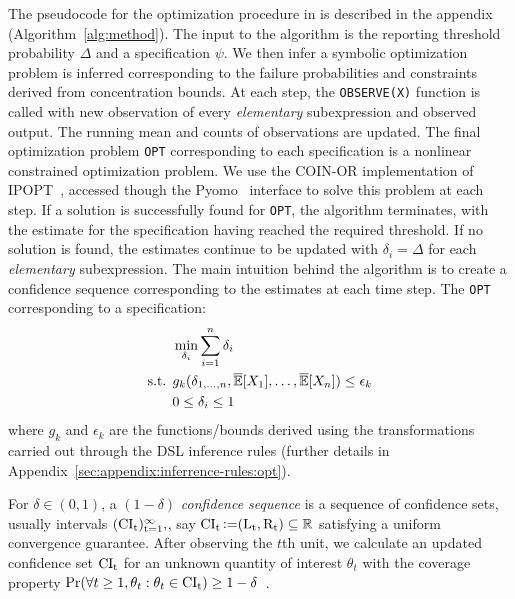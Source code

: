 The pseudocode for the optimization procedure in \AVOIRmethodname{} is described in  the appendix (Algorithm~\ref{alg:method}).
The input to the algorithm is the reporting threshold probability $\Delta$ and a specification $\psi$.
We then infer a symbolic optimization problem is inferred corresponding to the failure probabilities and constraints derived from concentration bounds.
At each step, the \texttt{OBSERVE(X)} function is called with new observation of every \textit{elementary} subexpression and observed output.
The running mean and counts of observations are updated.
The final optimization problem \texttt{OPT} corresponding to each specification is a nonlinear constrained optimization problem.
We use the COIN-OR implementation of IPOPT~\citep{wachter2006implementation}, accessed though the Pyomo~\citep{hart2011pyomo} interface to solve this problem at each step.
If a solution is successfully found for \texttt{OPT}, the algorithm terminates, with the estimate for the specification having reached the required threshold.
If no solution is found, the estimates continue to be updated with $\delta_i = \Delta$ for each \textit{elementary} subexpression.
The main intuition behind the algorithm is to create a confidence sequence corresponding to the estimates at each time step.
The \texttt{OPT} corresponding to a specification:
\begin{align}
    \label{eq:optimization}
    \begin{split}
        &\min_{\delta_i} \sum_{i=1}^{n}\delta_i  \\
        \text{s.t. } &g_k(\delta_{1, \dots, n}, \overline{\mathbb{E}}[X_1], \dots, \overline{\mathbb{E}}[X_n]) \leq \epsilon_k\\
        & 0 \leq \delta_i \leq 1
    \end{split}
\end{align}
where $g_k$ and $\epsilon_k$ are the functions/bounds derived using the transformations carried out through the DSL inference rules (further details in Appendix~\ref{sec:appendix:inferrence-rules:opt}).


\begin{definition}
For $\delta \in (0, 1)$, a $(1-\delta)$ \textit{confidence sequence} is a sequence of confidence sets, usually intervals  $(\rm{CI}_t)_{t=1}^\infty,$, say $\rm{CI}_t \operatorname{\vcentcolon=} (L_t, R_t) \subseteq {\mathbb{R}}$ satisfying a uniform convergence guarantee. After observing the $t$th unit, we calculate an updated confidence set $\rm{CI}_t$ for an unknown quantity of interest $\theta_t$ with the coverage property $\Pr(\forall t \geq 1, \theta_t: \theta_t \in \rm{CI}_t) \geq 1 - \delta$~\citep{howard2021time}.
\end{definition}

